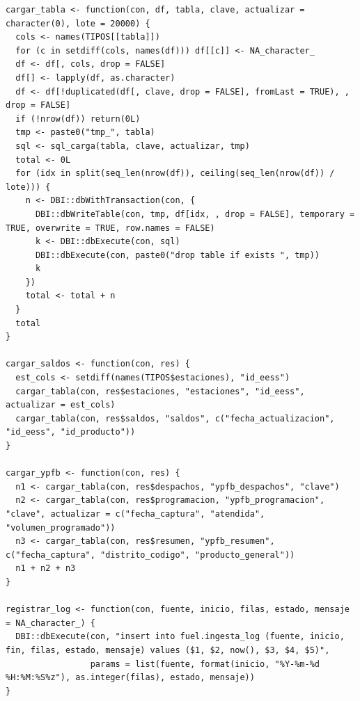 \begin{lstlisting}[style=anexoR]
cargar_tabla <- function(con, df, tabla, clave, actualizar = character(0), lote = 20000) {
  cols <- names(TIPOS[[tabla]])
  for (c in setdiff(cols, names(df))) df[[c]] <- NA_character_
  df <- df[, cols, drop = FALSE]
  df[] <- lapply(df, as.character)
  df <- df[!duplicated(df[, clave, drop = FALSE], fromLast = TRUE), , drop = FALSE]
  if (!nrow(df)) return(0L)
  tmp <- paste0("tmp_", tabla)
  sql <- sql_carga(tabla, clave, actualizar, tmp)
  total <- 0L
  for (idx in split(seq_len(nrow(df)), ceiling(seq_len(nrow(df)) / lote))) {
    n <- DBI::dbWithTransaction(con, {
      DBI::dbWriteTable(con, tmp, df[idx, , drop = FALSE], temporary = TRUE, overwrite = TRUE, row.names = FALSE)
      k <- DBI::dbExecute(con, sql)
      DBI::dbExecute(con, paste0("drop table if exists ", tmp))
      k
    })
    total <- total + n
  }
  total
}

cargar_saldos <- function(con, res) {
  est_cols <- setdiff(names(TIPOS$estaciones), "id_eess")
  cargar_tabla(con, res$estaciones, "estaciones", "id_eess", actualizar = est_cols)
  cargar_tabla(con, res$saldos, "saldos", c("fecha_actualizacion", "id_eess", "id_producto"))
}

cargar_ypfb <- function(con, res) {
  n1 <- cargar_tabla(con, res$despachos, "ypfb_despachos", "clave")
  n2 <- cargar_tabla(con, res$programacion, "ypfb_programacion", "clave", actualizar = c("fecha_captura", "atendida", "volumen_programado"))
  n3 <- cargar_tabla(con, res$resumen, "ypfb_resumen", c("fecha_captura", "distrito_codigo", "producto_general"))
  n1 + n2 + n3
}

registrar_log <- function(con, fuente, inicio, filas, estado, mensaje = NA_character_) {
  DBI::dbExecute(con, "insert into fuel.ingesta_log (fuente, inicio, fin, filas, estado, mensaje) values ($1, $2, now(), $3, $4, $5)",
                 params = list(fuente, format(inicio, "%Y-%m-%d %H:%M:%S%z"), as.integer(filas), estado, mensaje))
}
\end{lstlisting}


